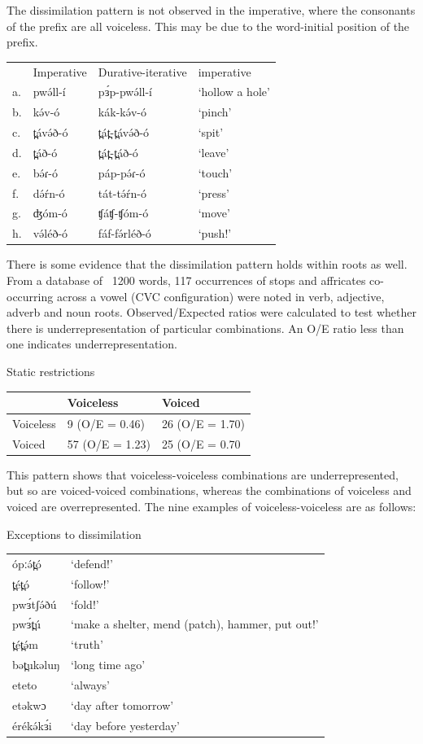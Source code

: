 The dissimilation pattern is not observed in the imperative, where the consonants of the prefix are all voiceless. This may be due to the word-initial position of the prefix. 

\ea
\begin{tabular}[t]{llll}
&		Imperative	&Durative-iterative &imperative\\
a.	&	pwə́ll-í	&	pɜ́p-pwə́ll-í	&	‘hollow a hole’\\
b.	&	kə́v-ó	&	kák-kə́v-ó	&	‘pinch’\\
c.	&	t̪ávə́ð-ó	&	t̪át̪-t̪ávə́ð-ó	&	‘spit’\\
d.	&	t̪áð-ó	&	t̪át̪-t̪áð-ó	&	‘leave’\\
e.	&	bə́ɾ-ó	&	páp-pə́ɾ-ó	&	‘touch’\\
f.	&	də́ŕn-ó	&	tát-tə́ŕn-ó	&	‘press’\\
g.	&	ʤóm-ó	&	ʧáʧ-ʧóm-ó	&	‘move’\\
h.	&	və́léð-ó	&	fáf-fə́rléð-ó	&	‘push!’\\
\end{tabular}
\z

There is some evidence that the dissimilation pattern holds within roots as well. From a database of ~1200 words, 117 occurrences of stops and affricates co-occurring across a vowel (CVC configuration) were noted in verb, adjective, adverb and noun roots. Observed/Expected ratios were calculated to test whether there is underrepresentation of particular combinations. An O/E ratio less than one indicates underrepresentation.

\ea Static restrictions\\
\begin{tabular}[t]{l|ll}
&	Voiceless	&	Voiced\\
\hline
Voiceless	&	9  (O/E = 0.46)	&	26   (O/E = 1.70)\\
Voiced		&	57  (O/E = 1.23)&	25   (O/E = 0.70\\
\end{tabular}
\z

This pattern shows that voiceless-voiceless combinations are underrepresented, but so are voiced-voiced combinations, whereas the combinations of voiceless and voiced are overrepresented. The nine examples of voiceless-voiceless are as follows:

\ea Exceptions to dissimilation\\
\begin{tabular}[t]{ll}
ópːə́t̪ó 	&	‘defend!’\\
t̪ét̪ó 	&	‘follow!’\\
pwɜ́tʃə́ðú	&	‘fold!’\\
pwɜ́t̪ú	&	‘make a shelter, mend (patch), hammer, put out!’\\
t̪ét̪ə́m	&	‘truth’\\
bət̪ukəluŋ&	‘long time ago’\\
eteto	&	‘always’\\
etəkwɔ	&	‘day after tomorrow’\\
érékə́kɜ́i	&	‘day before yesterday’\\
\end{tabular}
\z

